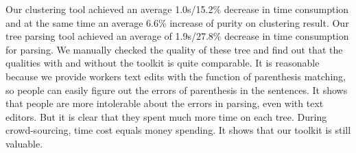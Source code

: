 Our clustering tool achieved an average 1.0s/15.2\% decrease in time consumption and at the same time an average 6.6\% increase of purity on clustering result. Our tree parsing tool achieved an average of 1.9s/27.8\% decrease in time consumption for parsing. We manually checked the quality of these tree and find out that the qualities with and without the toolkit is quite comparable. It is reasonable because we provide workers text edits with the function of parenthesis matching, so people can easily figure out the errors of parenthesis in the sentences. It shows that people are more intolerable about the errors in parsing, even with text editors. But it is clear that they spent much more time on each tree. During crowd-sourcing, time cost equals money spending. It shows that our toolkit is still valuable.



